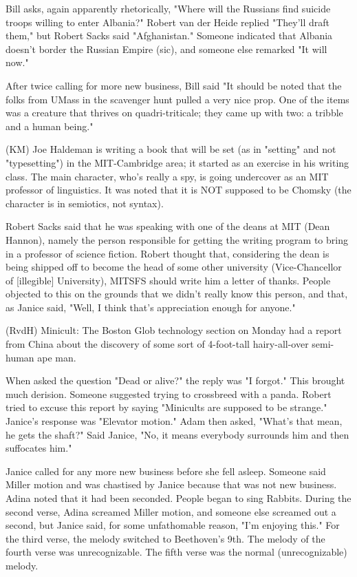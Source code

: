 \documentclass[12pt]{article}
\begin{document}
Bill asks, again apparently rhetorically, "Where will the Russians find suicide troops willing to enter Albania?" Robert van der Heide replied "They'll draft them," but Robert Sacks said "Afghanistan." Someone indicated that Albania doesn't border the Russian Empire (sic), and someone else remarked "It will now."

After twice calling for more new business, Bill said "It should be noted that the folks from UMass in the scavenger hunt pulled a very nice prop. One of the items was a creature that thrives on quadri-triticale; they came up with two: a tribble and a human being."

(KM) Joe Haldeman is writing a book that will be set (as in "setting" and not "typesetting") in the MIT-Cambridge area; it started as an exercise in his writing class. The main character, who's really a spy, is going undercover as an MIT professor of linguistics. It was noted that it is NOT supposed to be Chomsky (the character is in semiotics, not syntax).

Robert Sacks said that he was speaking with one of the deans at MIT (Dean Hannon), namely the person responsible for getting the writing program to bring in a professor of science fiction. Robert thought that, considering the dean is being shipped off to become the head of some other university (Vice-Chancellor of [illegible] University), MITSFS should write him a letter of thanks. People objected to this on the grounds that we didn't really know this person, and that, as Janice said, "Well, I think that's appreciation enough for anyone."

(RvdH) Minicult: The Boston Glob technology section on Monday had a report from China about the discovery of some sort of 4-foot-tall hairy-all-over semi-human ape man.

When asked the question "Dead or alive?" the reply was "I forgot." This brought much derision. Someone suggested trying to crossbreed with a panda. Robert tried to excuse this report by saying "Minicults are supposed to be strange." Janice's response was "Elevator motion." Adam then asked, "What's that mean, he gets the shaft?" Said Janice, "No, it means everybody surrounds him and then suffocates him."

Janice called for any more new business before she fell asleep. Someone said Miller motion and was chastised by Janice because that was not new business. Adina noted that it had been seconded. People began to sing Rabbits. During the second verse, Adina screamed Miller motion, and someone else screamed out a second, but Janice said, for some unfathomable reason, "I'm enjoying this." For the third verse, the melody switched to Beethoven's 9th. The melody of the fourth verse was unrecognizable. The fifth verse was the normal (unrecognizable) melody.
\end{document}
